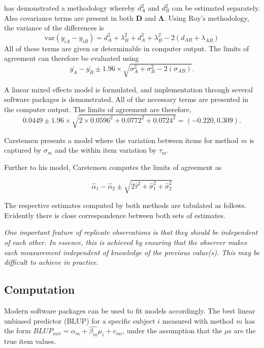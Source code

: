 \documentclass[12pt, a4paper]{report}
\theoremstyle{plain}
\theoremstyle{definition}
\theoremstyle{remark}
\begin{document}
\citet{ARoy2009} has demonstrated a methodology whereby $d^2_{A}$ and $d^2_{B}$ can be estimated separately. Also covariance terms are present in both $\boldsymbol{D}$ and $\boldsymbol{\Lambda}$. Using Roy's methodology, the variance of the differences is
\begin{equation}
\mbox{var} (y_{iA}-y_{iB})= d^2_{A} + \lambda^2_{B} + d^2_{A} + \lambda^2_{B} - 2(d_{AB} + \lambda_{AB})
\end{equation}
All of these terms are given or determinable in computer output.
The limits of agreement can therefore be evaluated using
\begin{equation}
\bar{y_{A}}-\bar{y_{B}} \pm 1.96 \times \sqrt{ \sigma^2_{A} + \sigma^2_{B}  - 2(\sigma_{AB})}.
\end{equation}

A linear mixed effects model is formulated, and implementation through several software packages is demonstrated.
All of the necessary terms are presented in the computer output. The limits of agreement are therefore,
\begin{equation}
0.0449  \pm 1.96 \times  \sqrt{2 \times 0.0596^2 + 0.0772^2 + 0.0724^2} = (-0.220,  0.309).
\end{equation}



Carstensen presents a model where the variation between items for method $m$ is captured by $\sigma_m$ and the within item variation by $\tau_m$.

Further to his model, Carstensen computes the limits of agreement
as

\[
\hat{\alpha}_1 - \hat{\alpha}_2 \pm \sqrt{2 \hat{\tau}^2 +
	\hat{\sigma}^2_1 + \hat{\sigma}^2_2}
\]

The respective estimates computed by both methods are tabulated as follows. Evidently there is close correspondence between both sets of estimates.


\emph{
	One important feature of replicate observations is that they should be independent
	of each other. In essence, this is achieved by ensuring that the observer makes each
	measurement independent of knowledge of the previous value(s). This may be difficult
	to achieve in practice.}



\subsection{Computation} Modern software
packages can be used to fit models accordingly. The best linear
unbiased predictor (BLUP) for a specific subject $i$ measured with
method $m$ has the form $BLUP_{mir} = \hat{\alpha_{m}} +
\hat{\beta_{m}}\mu_{i} + c_{mi}$, under the assumption that the
$\mu$s are the true item values.
\end{document}
